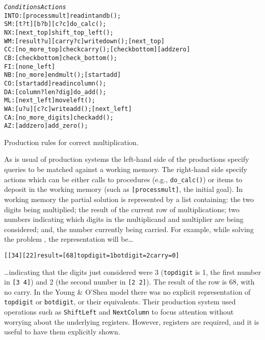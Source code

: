 \begin{fancytable}
\begin{alltt}
      {\em Conditions}                 {\em Actions}\smallskip
 INTO: [processmult]          \anarrow readintandb();
 SM:   [t ?t] [b ?b] [c ?c]   \anarrow do_calc();
 NX:   [next_top]             \anarrow [processmult] shift_top_left();
 WM:   [result ?u] [carry ?c] \anarrow writedown(); [next_top]
 CC:   [no_more_top]          \anarrow checkcarry(); [checkbottom] [addzero]
 CB:   [checkbottom]          \anarrow check_bottom();
 FI:   [none_left]            \anarrow [stop]\smallskip
 NB:   [no_more]              \anarrow endmult(); [startadd]
 CO:   [startadd]             \anarrow readincolumn();
 DA:   [column ?len ?dig]     \anarrow do_add();
 ML:   [next_left]            \anarrow [startadd] moveleft();
 WA:   [u ?u] [c ?c]          \anarrow writeadd(); [next_left]
 CA:   [no_more_digits]       \anarrow checkadd();
 AZ:   [addzero]              \anarrow add_zero();
\end{alltt}
\caption{Production rules for correct multiplication.}
\label{f:xprod}
\end{fancytable}


As is usual of production systems the left-hand side of the productions
specify queries to be matched against a working memory.  The right-hand
side specify actions which can be either calls to procedures
(e.g., \verb|do_calc()|) or items to deposit in the working memory
(such as \verb|[processmult]|, the initial goal).
In working memory the partial solution is represented
by a list containing: the two digits being multiplied; the result of the
current row of multiplications; two numbers indicating which digits in the
multiplicand and multiplier are being considered; and, the number currently
being carried.  For example, while solving the problem , the
representation will be\ldots
\begin{alltt}
  [ [3 4] [2 2] result=[6 8] topdigit=1 botdigit=2 carry=0 ]
\end{alltt}
\ldots indicating that the digits just considered were 3 (\verb|topdigit|
is 1, the first number in \verb|[3 4]|) and 2 (the second number in
\verb|[2 2]|).  The result of the row is 68, with no carry.  In the Young
\& O'Shea model there was no explicit representation of \verb|topdigit| or
\verb|botdigit|, or their equivalents.  Their production system used
operations such as \verb|ShiftLeft| and \verb|NextColumn| to focus
attention without worrying about the underlying registers.  However,
registers are required, and it is useful to have them explicitly shown.

